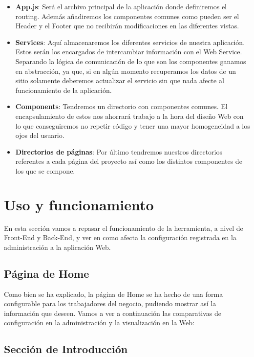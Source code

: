 \begin{itemize}
    \item \textbf{App.js}: Será el archivo principal de la aplicación donde definiremos el routing. Además añadiremos los componentes comunes como pueden ser el Header y el Footer que no recibirán modificaciones en las diferentes vistas.
    \item \textbf{Services}: Aquí almacenaremos los diferentes servicios de nuestra aplicación. Estos serán los encargados de intercambiar información con el Web Service. Separando la lógica de comunicación de lo que son los componentes ganamos en abstracción, ya que, si en algún momento recuperamos los datos de un sitio solamente deberemos actualizar el servicio sin que nada afecte al funcionamiento de la aplicación.
    \item \textbf{Components}: Tendremos un directorio con componentes comunes. El encapsulamiento de estos nos ahorrará trabajo a la hora del diseño Web con lo que conseguiremos no repetir código y tener una mayor homogeneidad a los ojos del usuario.
    \item \textbf{Directorios de páginas}: Por último tendremos nuestros directorios referentes a cada página del proyecto así como los distintos componentes de los que se compone.
\end{itemize}

\section{Uso y funcionamiento}

En esta sección vamos a repasar el funcionamiento de la herramienta, a nivel de Front-End y Back-End, y ver en como afecta la configuración registrada en la administración a la aplicación Web.

\subsection{Página de Home}

Como bien se ha explicado, la página de Home se ha hecho de una forma configurable para los trabajadores del negocio, pudiendo mostrar así la información que deseen. Vamos a ver a continuación las comparativas de configuración en la administración y la visualización en la Web:

\subsection{Sección de Introducción}

